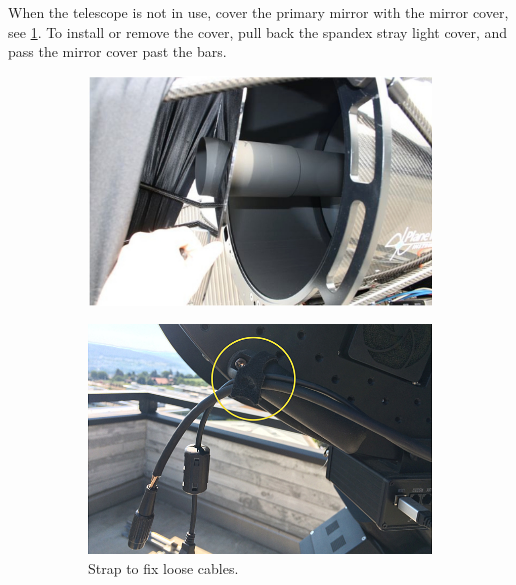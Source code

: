 \documentclass[a4paper, 11pt, fleqn]{memoir}
\begin{document}
When the telescope is not in use, cover the primary mirror with the mirror cover, see \cref{fig:mirror-cover}.
To install or remove the cover, pull back the spandex stray light cover, and pass the mirror cover past the bars.

\begin{figure}
    \centering
    \begin{subfigure}[c]{0.47\textwidth}
        \includegraphics[width=\textwidth]{mirror-cover}
        \label{fig:mirror-cover}
    \end{subfigure}
    \begin{subfigure}[c]{0.47\textwidth}
        \includegraphics[width=\textwidth]{cable-strap}
        \caption{Strap to fix loose cables.}
        \label{fig:cable-strap}
    \end{subfigure}
    \caption{ }
\end{figure}
\end{document}
